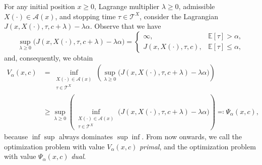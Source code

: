 \documentclass[11pt,tbtags,reqno]{article}
\theoremstyle{definition}
\numberwithin{equation}{section}
\theoremstyle{definition}
\begin{document}
For any initial position $x \ge 0$,  Lagrange multiplier $\lambda \ge 0$, admissible $X(\cdot) \in \mathcal{A}(x)$, and stopping time $\tau \in \mathcal{T}^X$, consider the Lagrangian $J(x, X(\cdot), \tau, c + \lambda) - \lambda \alpha$. Observe that we have
\begin{equation}\label{sup_lagrangian}
    \sup_{\lambda \ge 0}
    \Big(
        J(x, X(\cdot), \tau, c + \lambda) - \lambda \alpha 
    \Big) =
    \begin{cases}
        \infty, & \mathbb{E}[\tau] > \alpha, \\
        J(x, X(\cdot), \tau, c), & \mathbb{E}[\tau] \le \alpha,
    \end{cases}
\end{equation}
and, consequently, we obtain
\begin{equation}\label{duality_gap}
    \begin{split}
        V_\alpha(x, c)
        &=
        \inf\limits_{\substack{X(\cdot) \in \mathcal{A}(x) \\ \tau \in \mathcal{T}^X}} 
        \left(
        \sup_{\lambda \ge 0}
        \Big(
            J(x, X(\cdot), \tau, c + \lambda) - \lambda \alpha 
        \Big)
        \right)
        \\&\ge
        \sup_{\lambda \ge 0}
        \left(
        \inf\limits_{\substack{X(\cdot) \in \mathcal{A}(x) \\ \tau \in \mathcal{T}^X}} 
        \Big(
            J(x, X(\cdot), \tau, c + \lambda) - \lambda \alpha 
        \Big)
        \right)
        \eqqcolon
        \Psi_\alpha(x, c),
    \end{split}
\end{equation}
because $\inf \sup$ always dominates $\sup \inf$. From now onwards, we call the optimization problem with value $V_\alpha(x, c)$ \textit{primal}, and the optimization problem with value $\Psi_\alpha(x, c)$ \textit{dual}. 
\end{document}
